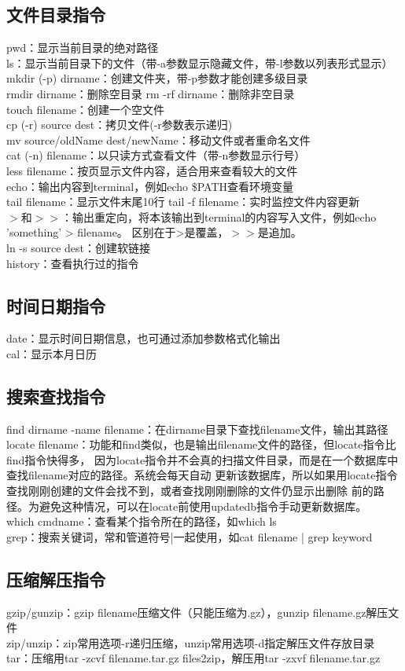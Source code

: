 \documentclass[11pt]{article}
\begin{document}
\subsection{文件目录指令}

pwd：显示当前目录的绝对路径 \\
ls：显示当前目录下的文件（带-a参数显示隐藏文件，带-l参数以列表形式显示） \\
mkdir (-p) dirname：创建文件夹，带-p参数才能创建多级目录  \\
rmdir dirname：删除空目录 \qquad rm -rf dirname：删除非空目录  \\
touch filename：创建一个空文件 \\
cp (-r) source dest：拷贝文件(-r参数表示递归)  \\
mv source/oldName dest/newName：移动文件或者重命名文件  \\
cat (-n) filename：以只读方式查看文件（带-n参数显示行号）  \\
less filename：按页显示文件内容，适合用来查看较大的文件  \\
echo：输出内容到terminal，例如echo \$PATH查看环境变量 \\
tail filename：显示文件末尾10行 \qquad tail -f filename：实时监控文件内容更新 \\
$>$和$>>$：输出重定向，将本该输出到terminal的内容写入文件，例如echo 'something' > filename。
区别在于>是覆盖，$>>$是追加。  \\
ln -s source dest：创建软链接  \\
history：查看执行过的指令

\subsection{时间日期指令}
date：显示时间日期信息，也可通过添加参数格式化输出  \\
cal：显示本月日历

\subsection{搜索查找指令}
find dirname -name filename：在dirname目录下查找filename文件，输出其路径 \\
locate filename：功能和find类似，也是输出filename文件的路径，但locate指令比find指令快得多，
因为locate指令并不会真的扫描文件目录，而是在一个数据库中查找filename对应的路径。系统会每天自动
更新该数据库，所以如果用locate指令查找刚刚创建的文件会找不到，或者查找刚刚删除的文件仍显示出删除
前的路径。为避免这种情况，可以在locate前使用updatedb指令手动更新数据库。  \\
which cmdname：查看某个指令所在的路径，如which ls  \\
grep：搜索关键词，常和管道符号|一起使用，如cat filename | grep keyword

\subsection{压缩解压指令}
gzip/gunzip：gzip filename压缩文件（只能压缩为.gz），gunzip filename.gz解压文件  \\
zip/unzip：zip常用选项-r递归压缩，unzip常用选项-d指定解压文件存放目录  \\
tar：压缩用tar -zcvf filename.tar.gz files2zip，解压用tar -zxvf filename.tar.gz







    
\end{document}
